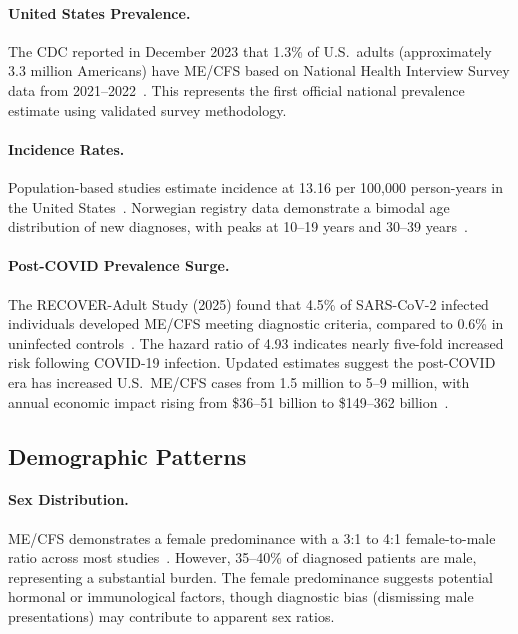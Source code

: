 \paragraph{United States Prevalence.}
The CDC reported in December 2023 that 1.3\% of U.S.\ adults (approximately 3.3 million Americans) have ME/CFS based on National Health Interview Survey data from 2021--2022~\cite{CDC2023prevalence}. This represents the first official national prevalence estimate using validated survey methodology.

\paragraph{Incidence Rates.}
Population-based studies estimate incidence at 13.16 per 100,000 person-years in the United States~\cite{Vincent2012incidence}. Norwegian registry data demonstrate a bimodal age distribution of new diagnoses, with peaks at 10--19 years and 30--39 years~\cite{Bakken2014incidence}.

\paragraph{Post-COVID Prevalence Surge.}
The RECOVER-Adult Study (2025) found that 4.5\% of SARS-CoV-2 infected individuals developed ME/CFS meeting diagnostic criteria, compared to 0.6\% in uninfected controls~\cite{RECOVER2025}. The hazard ratio of 4.93 indicates nearly five-fold increased risk following COVID-19 infection. Updated estimates suggest the post-COVID era has increased U.S.\ ME/CFS cases from 1.5 million to 5--9 million, with annual economic impact rising from \$36--51 billion to \$149--362 billion~\cite{Jason2022prevalence}.

\subsection{Demographic Patterns}
\label{subsec:demographics}

\paragraph{Sex Distribution.}
ME/CFS demonstrates a female predominance with a 3:1 to 4:1 female-to-male ratio across most studies~\cite{Bakken2014incidence,Lim2020prevalence}. However, 35--40\% of diagnosed patients are male, representing a substantial burden. The female predominance suggests potential hormonal or immunological factors, though diagnostic bias (dismissing male presentations) may contribute to apparent sex ratios.

